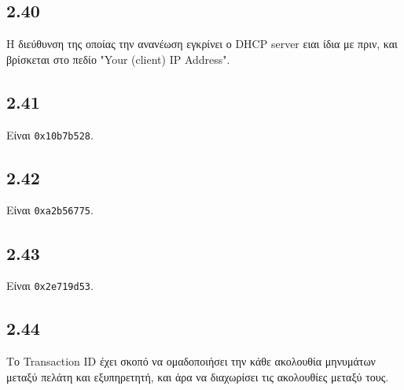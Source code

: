 		\subsection*{2.40}
			Η διεύθυνση της οποίας την ανανέωση εγκρίνει ο DHCP server ειαι ίδια με πριν, και βρίσκεται στο πεδίο "Your (client) IP Address".

		\subsection*{2.41}
			Είναι \verb|0x10b7b528|.

		\subsection*{2.42}
			Είναι \verb|0xa2b56775|.

		\subsection*{2.43}
			Είναι \verb|0x2e719d53|.

		\subsection*{2.44}
			Το Transaction ID έχει σκοπό να ομαδοποιήσει την κάθε ακολουθία μηνυμάτων μεταξύ πελάτη και εξυπηρετητή, και άρα να διαχωρίσει τις ακολουθίες μεταξύ τους. 
